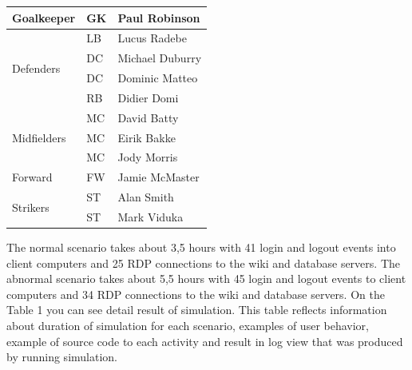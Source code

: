\begin{tabular}{ |l|l|l| }
\hline
Goalkeeper & GK & Paul Robinson \\ \hline
\multirow{4}{*}{Defenders} & LB & Lucus Radebe \\
 & DC & Michael Duburry \\
 & DC & Dominic Matteo \\
 & RB & Didier Domi \\ \hline
\multirow{3}{*}{Midfielders} & MC & David Batty \\
 & MC & Eirik Bakke \\
 & MC & Jody Morris \\ \hline
Forward & FW & Jamie McMaster \\ \hline
\multirow{2}{*}{Strikers} & ST & Alan Smith \\
 & ST & Mark Viduka \\
\hline
\end{tabular}




The normal scenario takes about 3,5 hours with 41 login and logout events into client computers and 25 RDP connections to the wiki and database servers. The abnormal scenario takes about 5,5 hours with 45 login and logout events to client computers and 34 RDP connections to the wiki and database servers. On the Table 1 you can see detail result of simulation. This table reflects information about duration of simulation for each scenario, examples of user behavior, example of source code to each activity and result in log view that was produced by running simulation.


 
% 